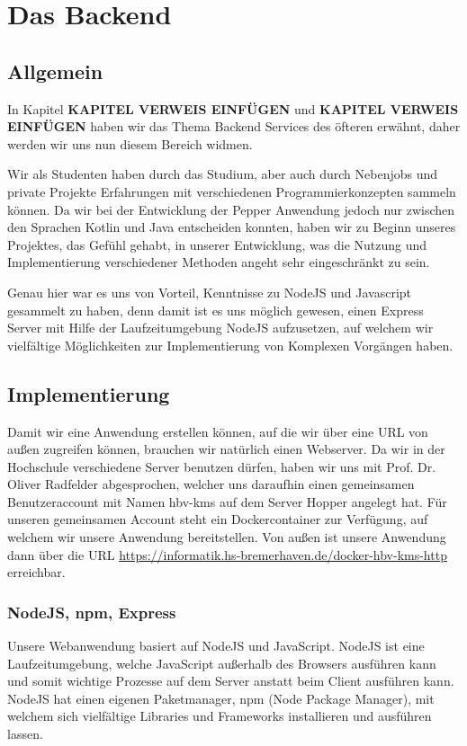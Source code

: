 \chapter{Das Backend}
\label{sec:das-backend}

\section{Allgemein}
In Kapitel \textbf{KAPITEL VERWEIS EINFÜGEN} und \textbf{KAPITEL VERWEIS EINFÜGEN} haben wir das Thema Backend Services
des öfteren erwähnt, daher werden wir uns nun diesem Bereich widmen.

Wir als Studenten haben durch das Studium, aber auch durch Nebenjobs und private Projekte Erfahrungen
mit verschiedenen Programmierkonzepten sammeln können. Da wir bei der Entwicklung der Pepper Anwendung
jedoch nur zwischen den Sprachen Kotlin und Java entscheiden konnten, haben wir zu Beginn unseres Projektes,
das Gefühl gehabt, in unserer Entwicklung, was die Nutzung und Implementierung verschiedener
Methoden angeht sehr eingeschränkt zu sein.

Genau hier war es uns von Vorteil, Kenntnisse zu NodeJS und Javascript gesammelt zu haben, denn damit
ist es uns möglich gewesen, einen Express Server mit Hilfe der Laufzeitumgebung NodeJS aufzusetzen,
auf welchem wir vielfältige Möglichkeiten zur Implementierung von Komplexen Vorgängen haben.

\section{Implementierung}
Damit wir eine Anwendung erstellen können, auf die wir über eine URL von außen zugreifen können,
brauchen wir natürlich einen Webserver. Da wir in der Hochschule verschiedene Server benutzen dürfen,
haben wir uns mit Prof. Dr. Oliver Radfelder abgesprochen, welcher uns daraufhin einen
gemeinsamen Benutzeraccount mit Namen \grqq{}hbv-kms\grqq{} auf dem Server Hopper
angelegt hat.
Für unseren gemeinsamen Account steht ein Dockercontainer zur Verfügung, auf welchem wir unsere
Anwendung bereitstellen. Von außen ist unsere Anwendung dann über die URL
\href{https://informatik.hs-bremerhaven.de/docker-hbv-kms-http}{https://informatik.hs-bremerhaven.de/docker-hbv-kms-http}
erreichbar.

\subsection{NodeJS, npm, Express}
Unsere Webanwendung basiert auf NodeJS und JavaScript. NodeJS ist eine Laufzeitumgebung, welche JavaScript außerhalb des Browsers
ausführen kann und somit wichtige Prozesse auf dem Server anstatt beim Client ausführen kann. NodeJS hat einen eigenen Paketmanager,
npm (Node Package Manager), mit welchem sich vielfältige Libraries und Frameworks installieren und ausführen lassen.

